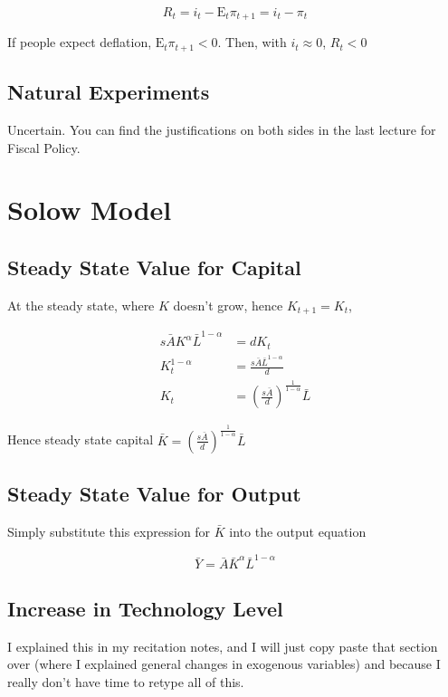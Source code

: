 \documentclass[11pt]{scrartcl}
\newcommand{\oneth}{\ensuremath{\alpha}}
\newcommand{\twoth}{\ensuremath{1-\alpha}}
\begin{document}
\[ R_t = i_t - \mathrm{E}_t \pi_{t+1} = i_t - \pi_t \] 

If people expect deflation, $\mathrm{E}_t \pi_{t+1} < 0$. Then, with $i_t \approx 0$, $R_t < 0$

\subsection{Natural Experiments}

Uncertain. You can find the justifications on both sides in the last lecture for Fiscal Policy.

\section{Solow Model}

\subsection{Steady State Value for Capital}

At the steady state, where $K$ doesn't grow, hence $K_{t+1} = K_t$, 

\begin{align*}
s\bar{A}K^{\oneth}\bar{L}^{\twoth} &= dK_t \\
K_t^{\twoth} &= \frac{s\bar{A}\bar{L}^{\twoth}}{d} \\
K_t &= \left(\frac{s\bar{A}}{d}\right)^{\frac{1}{1-\alpha}}\bar{L}
\end{align*}

Hence steady state capital $\bar{K} = \left(\frac{s\bar{A}}{d}\right)^{\frac{1}{1-\alpha}}\bar{L}$

\subsection{Steady State Value for Output}

Simply substitute this expression for $\bar{K}$ into the output equation

\[\bar{Y} = \bar{A}\bar{K}^\alpha \bar{L}^{1-\alpha} \]

\subsection{Increase in Technology Level}

I explained this in my recitation notes, and I will just copy paste that section over (where I explained general changes in exogenous variables) and because I really don't have time to retype all of this.
\end{document}
